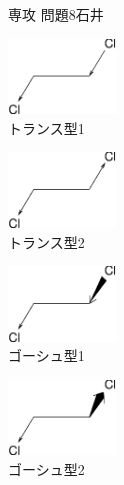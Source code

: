 \documentclass[fleqn]{jbook}
\begin{document}
\begin{answer}{専攻 問題8}{石井}
\begin{subanswers}
\begin{subsubanswers}
 \begin{minipage}{\linewidth}
 \begin{center}
  \begin{minipage}{.3\linewidth}
   \begin{center}
    \includegraphics[height=2cm]{1999phy8-6.eps}\\
    トランス型1
   \end{center}
  \end{minipage}
  \hspace{.1\linewidth}
  \begin{minipage}{.3\linewidth}
   \begin{center}
    \includegraphics[height=2cm]{1999phy8-7.eps}\\
    トランス型2
   \end{center}
  \end{minipage}
 \end{center}
 \end{minipage}

 \begin{minipage}{\linewidth}
 \begin{center}
  \begin{minipage}{.3\linewidth}
   \begin{center}
    \includegraphics[height=2cm]{1999phy8-8.eps}\\
    ゴーシュ型1
   \end{center}
  \end{minipage}
    \hspace{.1\linewidth}
  \begin{minipage}{.3\linewidth}
   \begin{center}
    \includegraphics[height=2cm]{1999phy8-9.eps}\\
    ゴーシュ型2
   \end{center}
  \end{minipage}
 \end{center}
 \end{minipage}\\


\end{subsubanswers}
\end{subanswers}
\end{answer}
\end{document}
